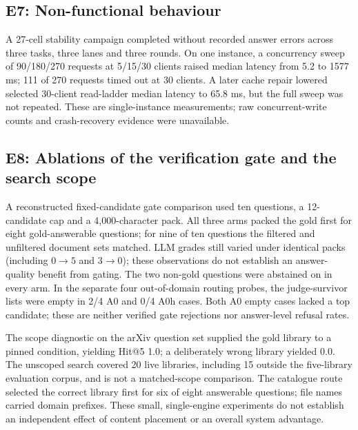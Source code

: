 \subsection{E7: Non-functional behaviour}
\label{sec:e7}
A 27-cell stability campaign completed without recorded answer errors across
three tasks, three lanes and three rounds. On one instance, a concurrency
sweep of 90/180/270 requests at 5/15/30 clients raised median latency from
5.2 to 1577 ms; 111 of 270 requests timed out at 30 clients. A later cache
repair lowered selected 30-client read-ladder median latency to 65.8 ms, but
the full sweep was not repeated. These are single-instance measurements;
raw concurrent-write counts and crash-recovery evidence were unavailable.

\subsection{E8: Ablations of the verification gate and the search scope}
\label{sec:e8}
A reconstructed fixed-candidate gate comparison used ten questions, a
12-candidate cap and a 4,000-character pack. All three arms packed the gold
first for eight gold-answerable questions; for nine of ten questions the
filtered and unfiltered document sets matched. LLM grades still varied under
identical packs (including $0\to5$ and $3\to0$); these observations do not
establish an answer-quality benefit from gating. The two non-gold questions
were abstained on in every arm. In the separate four out-of-domain routing
probes, the judge-survivor lists were empty in 2/4 A0 and 0/4 A0h cases.
Both A0 empty cases lacked a top candidate; these are neither verified gate
rejections nor answer-level refusal rates.

The scope diagnostic on the arXiv question set supplied the gold library to a
pinned condition, yielding Hit@5 1.0; a deliberately wrong library yielded
0.0. The unscoped search covered 20 live libraries, including 15 outside the
five-library evaluation corpus, and is not a matched-scope comparison. The
catalogue route selected the correct library first for six of eight
answerable questions; file names carried domain prefixes. These small,
single-engine experiments do not establish an independent effect of content
placement or an overall system advantage.
